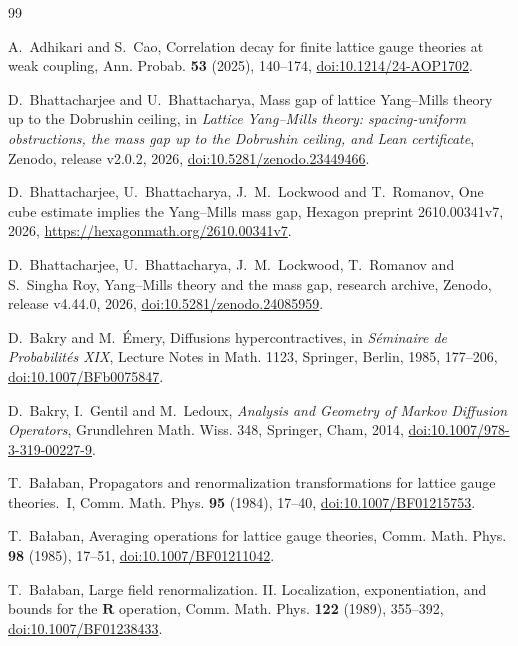 
\begin{thebibliography}{99}

A.~Adhikari and S.~Cao, Correlation decay for finite lattice gauge theories at weak coupling, Ann. Probab. \textbf{53} (2025), 140--174, \href{https://doi.org/10.1214/24-AOP1702}{doi:10.1214/24-AOP1702}.

D.~Bhattacharjee and U.~Bhattacharya, Mass gap of lattice Yang--Mills theory
up to the Dobrushin ceiling, in \emph{Lattice Yang--Mills theory: spacing-uniform
obstructions, the mass gap up to the Dobrushin ceiling, and Lean certificate},
Zenodo, release v2.0.2, 2026,
\href{https://doi.org/10.5281/zenodo.23449466}{doi:10.5281/zenodo.23449466}.

D.~Bhattacharjee, U.~Bhattacharya, J.~M.~Lockwood and T.~Romanov, One cube
estimate implies the Yang--Mills mass gap, Hexagon preprint 2610.00341v7,
2026, \url{https://hexagonmath.org/2610.00341v7}.

D.~Bhattacharjee, U.~Bhattacharya, J.~M.~Lockwood, T.~Romanov and S.~Singha
Roy, Yang--Mills theory and the mass gap, research archive, Zenodo, release
v4.44.0, 2026,
\href{https://doi.org/10.5281/zenodo.24085959}{doi:10.5281/zenodo.24085959}.

D.~Bakry and M.~\'Emery, Diffusions hypercontractives, in \emph{S\'eminaire
de Probabilit\'es XIX}, Lecture Notes in Math. 1123, Springer, Berlin, 1985,
177--206, \href{https://doi.org/10.1007/BFb0075847}{doi:10.1007/BFb0075847}.

D.~Bakry, I.~Gentil and M.~Ledoux, \emph{Analysis and Geometry of Markov
Diffusion Operators}, Grundlehren Math. Wiss. 348, Springer, Cham, 2014,
\href{https://doi.org/10.1007/978-3-319-00227-9}{doi:10.1007/978-3-319-00227-9}.

T.~Ba{\l}aban, Propagators and renormalization transformations for lattice
gauge theories.~I, Comm. Math. Phys. \textbf{95} (1984), 17--40,
\href{https://doi.org/10.1007/BF01215753}{doi:10.1007/BF01215753}.

T.~Ba{\l}aban, Averaging operations for lattice gauge theories, Comm. Math.
Phys. \textbf{98} (1985), 17--51,
\href{https://doi.org/10.1007/BF01211042}{doi:10.1007/BF01211042}.

T.~Ba{\l}aban, Large field renormalization. II. Localization,
exponentiation, and bounds for the $\mathbf R$ operation, Comm. Math. Phys.
\textbf{122} (1989), 355--392,
\href{https://doi.org/10.1007/BF01238433}{doi:10.1007/BF01238433}.


\end{thebibliography}
